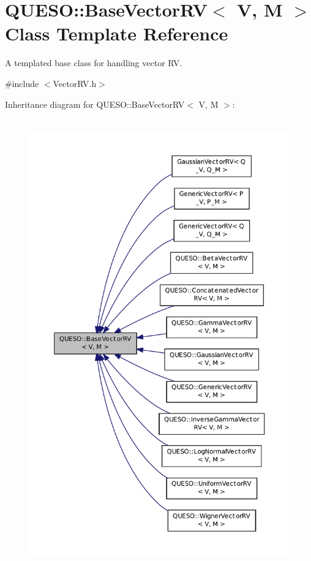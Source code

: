 \hypertarget{class_q_u_e_s_o_1_1_base_vector_r_v}{\section{Q\-U\-E\-S\-O\-:\-:Base\-Vector\-R\-V$<$ V, M $>$ Class Template Reference}
\label{class_q_u_e_s_o_1_1_base_vector_r_v}
}


A templated base class for handling vector R\-V.  




{\ttfamily \#include $<$Vector\-R\-V.\-h$>$}



Inheritance diagram for Q\-U\-E\-S\-O\-:\-:Base\-Vector\-R\-V$<$ V, M $>$\-:
\nopagebreak
\begin{figure}[H]
\begin{center}
\leavevmode
\includegraphics[height=550pt]{class_q_u_e_s_o_1_1_base_vector_r_v__inherit__graph}
\end{center}
\end{figure}


